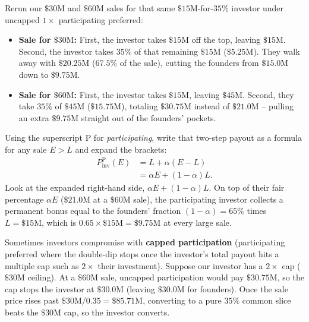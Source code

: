 Rerun our $\$30\text{M}$ and $\$60\text{M}$ sales for that same $\$15\text{M}$-for-$35\%$ investor under uncapped $1\times$ participating preferred:
\begin{itemize}
  \item \textbf{Sale for $\$30\text{M}$:} First, the investor takes $\$15\text{M}$ off the top, leaving $\$15\text{M}$. Second, the investor takes $35\%$ of that remaining $\$15\text{M}$ ($\$5.25\text{M}$). They walk away with $\$20.25\text{M}$ ($67.5\%$ of the sale), cutting the founders from $\$15.0\text{M}$ down to $\$9.75\text{M}$.
  \item \textbf{Sale for $\$60\text{M}$:} First, the investor takes $\$15\text{M}$, leaving $\$45\text{M}$. Second, they take $35\%$ of $\$45\text{M}$ ($\$15.75\text{M}$), totaling $\$30.75\text{M}$ instead of $\$21.0\text{M}$ -- pulling an extra $\$9.75\text{M}$ straight out of the founders' pockets.
\end{itemize}

Using the superscript $\text{P}$ for \emph{participating}, write that two-step payout as a formula for any sale $E > L$ and expand the brackets:
\begin{align}\label{eq:participating-waterfall}
  P_{\text{inv}}^{\text{P}}(E) &= L + \alpha(E - L) \nonumber \\
  &= \alpha E + (1 - \alpha)L.
\end{align}
Look at the expanded right-hand side, $\alpha E + (1 - \alpha)L$. On top of their fair percentage $\alpha E$ ($\$21.0\text{M}$ at a $\$60\text{M}$ sale), the participating investor collects a permanent bonus equal to the founders' fraction $(1 - \alpha) = 65\%$ times $L = \$15\text{M}$, which is $0.65 \times \$15\text{M} = \$9.75\text{M}$ at every large sale.

Sometimes investors compromise with \textbf{capped participation} (participating preferred where the double-dip stops once the investor's total payout hits a multiple cap such as $2\times$ their investment). Suppose our investor has a $2\times$ cap ($\$30\text{M}$ ceiling). At a $\$60\text{M}$ sale, uncapped participation would pay $\$30.75\text{M}$, so the cap stops the investor at $\$30.0\text{M}$ (leaving $\$30.0\text{M}$ for founders). Once the sale price rises past $\$30\text{M} / 0.35 = \$85.71\text{M}$, converting to a pure $35\%$ common slice beats the $\$30\text{M}$ cap, so the investor converts.

